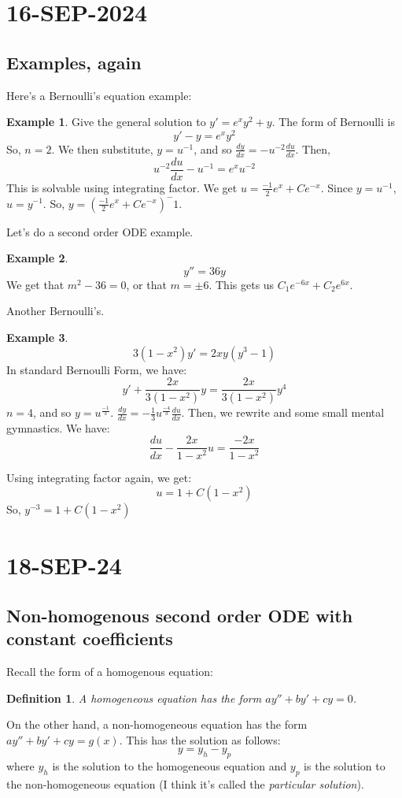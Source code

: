 \documentclass{article}
\newtheorem{defn}{Definition}
\theoremstyle{definition}
\newtheorem{example}{Example}[section]
\begin{document}
\section{16-SEP-2024}
\subsection{Examples, again}
Here's a Bernoulli's equation example:
\begin{example}
    Give the general solution to $y' = e^xy^2 + y$.
    The form of Bernoulli is 
    \[ 
    y' - y = e^xy^2
    \]
    So, $n=2$. We then substitute, $y = u^{-1}$, and so $\frac{dy}{dx} = -u^{-2} \frac{du}{dx}$. Then, 
    \[
        u^{-2} \frac{du}{dx} - u^{-1} = e^xu^{-2}
    \]
    This is solvable using integrating factor. We get $u = \frac{-1}{2}e^x + Ce^{-x}$. Since $y = u^{-1}$, $u = y^{-1}$. So, $y = (\frac{-1}{2}e^x + Ce^{-x})^-1$.
\end{example}
Let's do a second order ODE example.
\begin{example}
    \[
    y'' = 36y
    \]
    We get that $m^2 - 36 = 0$, or that $m = \pm 6$. This gets us $C_1e^{-6x} + C_2e^{6x}$. 
\end{example}
Another Bernoulli's. 
\begin{example}
    \[3(1-x^2)y' = 2xy(y^3-1) \]
    In standard Bernoulli Form, we have:
    \[
    y' + \frac{2x}{3(1-x^2)}y = \frac{2x}{3(1-x^2)}y^4
    \]
    $n = 4$, and so $ y = u^\frac{-1}{3} $. $\frac{dy}{dx} = -\frac{1}{3}u^\frac{-4}{3}\frac{du}{dx}$. Then, we rewrite and some small mental gymnastics.
    We have:
    \[ 
    \frac{du}{dx} - \frac{2x}{1-x^2}u = \frac{-2x}{1-x^2}
    \]

    Using integrating factor again, we get:
    \[ 
    u = 1 + C(1-x^2)
    \]
    So, $y^{-3} = 1 + C(1-x^2)$
\end{example}
\section{18-SEP-24}
\subsection{Non-homogenous second order ODE with constant coefficients}
Recall the form of a homogenous equation:
\begin{defn}
    A homogeneous equation has the form $ay'' + by' + cy = 0$.
\end{defn}

On the other hand, a non-homogeneous equation has the form $ay'' + by' + cy = g(x)$. This has the solution as follows:
\[  
y = y_h - y_p
\]
where $y_h$ is the solution to the homogeneous equation and $y_p$ is the solution to the non-homogeneous equation (I think it's called the \textit{particular solution}). 
\end{document}
